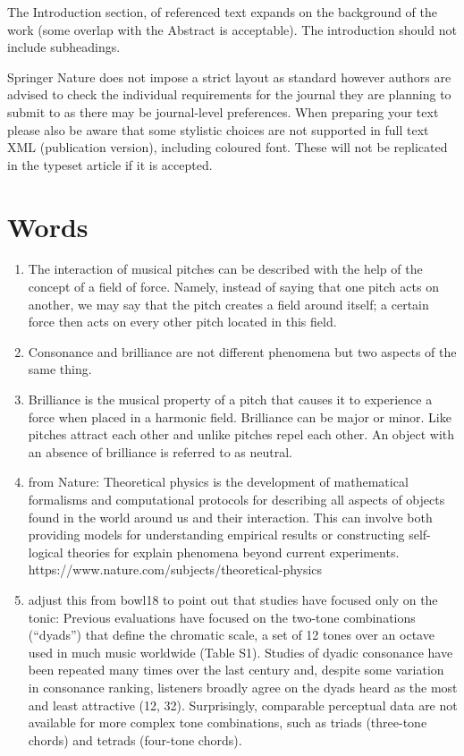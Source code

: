 \documentclass[sn-mathphys]{sn-jnl}%
\begin{document}
The Introduction section, of referenced text \cite{bib1} expands on the background of the work (some overlap with the Abstract is acceptable). The introduction should not include subheadings.

Springer Nature does not impose a strict layout as standard however authors are advised to check the individual requirements for the journal they are planning to submit to as there may be journal-level preferences. When preparing your text please also be aware that some stylistic choices are not supported in full text XML (publication version), including coloured font. These will not be replicated in the typeset article if it is accepted. 


\section{Words}\label{sec2}
\begin{enumerate}
\item The interaction of musical pitches can be described with the help of the concept of a field of force. Namely, instead of saying that one pitch acts on another, we may say that the pitch creates a field around itself; a certain force then acts on every other pitch located in this field.
\item Consonance and brilliance are not different phenomena but two aspects of the same thing.
\item Brilliance is the musical property of a pitch that causes it to experience a force when placed in a harmonic field. Brilliance can be major or minor. Like pitches attract each other and unlike pitches repel each other. An object with an absence of brilliance is referred to as neutral.
\item from Nature: Theoretical physics is the development of mathematical formalisms and computational protocols for describing all aspects of objects found in the world around us and their interaction. This can involve both providing models for understanding empirical results or constructing self-logical theories for explain phenomena beyond current experiments. https://www.nature.com/subjects/theoretical-physics
\item adjust this from bowl18 to point out that studies have focused only on the tonic: Previous evaluations have focused on the two-tone combinations (“dyads”) that define the chromatic scale, a set of 12 tones over an octave used in much music worldwide (Table S1). Studies of dyadic consonance have been repeated many times over the last century and, despite some variation in consonance ranking, listeners broadly agree on the dyads heard as the most and least attractive (12, 32). Surprisingly, comparable perceptual data are not available for more complex tone combinations, such as triads (three-tone chords) and tetrads (four-tone chords). 
\end{enumerate}
\end{document}
